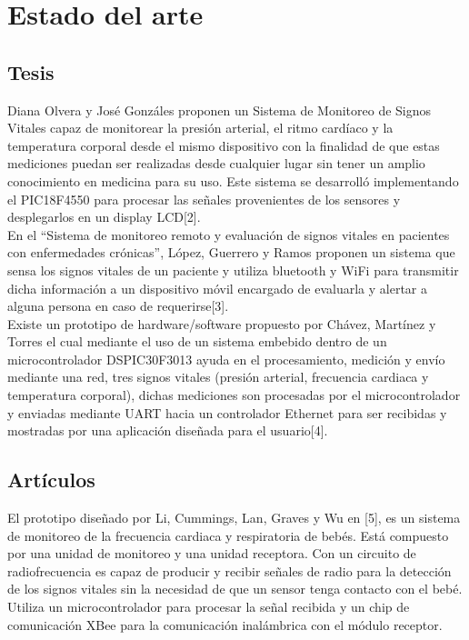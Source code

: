 
\section{Estado del arte}
\subsection{Tesis}
	Diana Olvera y José Gonzáles proponen un Sistema de Monitoreo de Signos Vitales capaz de monitorear la presión arterial, el ritmo cardíaco y la temperatura corporal desde el mismo dispositivo con la finalidad de que estas mediciones puedan ser realizadas desde cualquier lugar  sin tener un amplio conocimiento en medicina para su uso. Este sistema se desarrolló implementando el PIC18F4550 para procesar las señales provenientes de los sensores y desplegarlos en un display LCD[2].\\
	
	En el “Sistema de monitoreo remoto y evaluación de signos vitales en pacientes con enfermedades crónicas”, López, Guerrero y Ramos proponen un sistema que sensa los signos vitales de un paciente y utiliza bluetooth y WiFi para transmitir dicha información a un dispositivo móvil encargado de evaluarla y alertar a alguna persona en caso de requerirse[3].\\
	
	Existe un prototipo de hardware/software propuesto por Chávez, Martínez y Torres el cual mediante el uso de un sistema embebido dentro de un microcontrolador DSPIC30F3013 ayuda en el procesamiento, medición y envío mediante una red, tres signos vitales (presión arterial, frecuencia cardiaca y temperatura corporal), dichas mediciones son procesadas por el microcontrolador y enviadas mediante UART hacia un controlador Ethernet para ser recibidas y mostradas por una aplicación diseñada para el usuario[4]. \\

\subsection{Artículos}
	El prototipo diseñado por Li, Cummings, Lan, Graves y Wu en [5], es un sistema de monitoreo de la frecuencia cardiaca y respiratoria de bebés. Está compuesto por una unidad de monitoreo y una unidad receptora. Con un circuito de radiofrecuencia es capaz de producir y recibir señales de radio para la detección de los signos vitales sin la necesidad de que un sensor tenga contacto con el bebé. Utiliza un microcontrolador para procesar la señal recibida y un chip de comunicación XBee para la comunicación inalámbrica con el módulo receptor. \\
	

